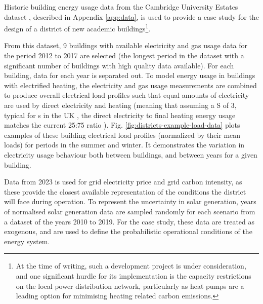 
Historic building energy usage data from the Cambridge University Estates dataset \citep{langtry2024CambridgeUniversityEstates}, described in Appendix \ref{app:data}, is used to provide a case study for the design of a district of new academic buildings\footnote{At the time of writing, such a development project is under consideration, and one significant hurdle for its implementation is the capacity restrictions on the local power distribution network, particularly as heat pumps are a leading option for minimising heating related carbon emissions.}.

From this dataset, 9 buildings with available electricity and gas usage data for the period 2012 to 2017 are selected (the longest period in the dataset with a significant number of buildings with high quality data available). For each building, data for each year is separated out. To model energy usage in buildings with electrified heating, the electricity and gas usage measurements are combined to produce overall electrical load profiles such that equal amounts of electricity are used by direct electricity and heating (meaning that assuming a S of 3, typical for s in the UK \citep{terry2023HowHeatDemand}, the direct electricity to final heating energy usage matches the current 25:75 ratio \citep{eea2023DecarbonisingHeatingCooling}). Fig. \ref{fig:districts-example-load-data} plots examples of these building electrical load profiles (normalized by their mean loads) for periods in the summer and winter. It demonstrates the variation in electricity usage behaviour both between buildings, and between years for a given building.

Data from 2023 is used for grid electricity price and grid carbon intensity, as these provide the closest available representation of the conditions the district will face during operation.
To represent the uncertainty in solar generation, years of normalised solar generation data are sampled randomly for each scenario from a dataset of the years 2010 to 2019.
For the case study, these data are treated as exogenous, and are used to define the probabilistic operational conditions of the energy system.\\

